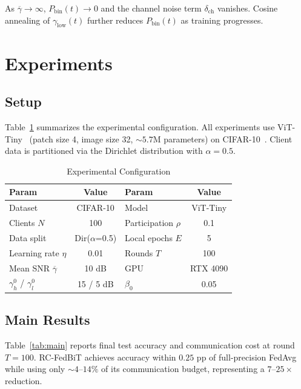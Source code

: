 \documentclass[conference]{IEEEtran}
\begin{document}
As $\overline{\gamma}\to\infty$, $P_{\mathrm{bin}}(t)\to 0$ and the channel noise term $\delta_{\mathrm{ch}}$ vanishes. Cosine annealing of $\gamma_{\mathrm{low}}(t)$ further reduces $P_{\mathrm{bin}}(t)$ as training progresses.

\section{Experiments}

\subsection{Setup}

Table~\ref{tab:setup} summarizes the experimental configuration. All experiments use ViT-Tiny~\cite{dosovitskiy2021image} (patch size 4, image size 32, $\sim\!5.7$M parameters) on CIFAR-10~\cite{krizhevsky2009learning}. Client data is partitioned via the Dirichlet distribution with $\alpha=0.5$.

\begin{table}[h]
\centering
\caption{Experimental Configuration}
\label{tab:setup}
\begin{tabular}{lc|lc}
\toprule
\textbf{Param} & \textbf{Value} & \textbf{Param} & \textbf{Value} \\
\midrule
Dataset & CIFAR-10 & Model & ViT-Tiny \\
Clients $N$ & 100 & Participation $\rho$ & 0.1 \\
Data split & Dir($\alpha$=0.5) & Local epochs $E$ & 5 \\
Learning rate $\eta$ & 0.01 & Rounds $T$ & 100 \\
Mean SNR $\overline{\gamma}$ & 10 dB & GPU & RTX 4090 \\
$\gamma_h^0$ / $\gamma_l^0$ & 15 / 5 dB & $\beta_0$ & 0.05 \\
\bottomrule
\end{tabular}
\end{table}

\subsection{Main Results}

Table~\ref{tab:main} reports final test accuracy and communication cost at round $T=100$. RC-FedBiT achieves accuracy within $0.25$ pp of full-precision FedAvg while using only $\sim\!4$--$14\%$ of its communication budget, representing a $7$--$25\times$ reduction.
\end{document}
